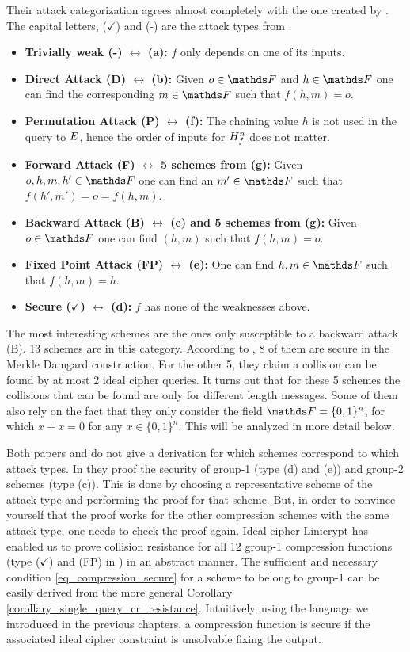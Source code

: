 Their attack categorization agrees almost completely with the one created by \cite{C:PreGovVan93}.
The capital letters, ($\checkmark$) and (-) are the attack types from \cite{C:PreGovVan93}.
\begin{itemize}
\item \textbf{Trivially weak (-) $\leftrightarrow$ (a):} $f$ only depends on one of its inputs.
\item \textbf{Direct Attack (D) $\leftrightarrow$ (b):} Given $o \in \F$ and $h \in \F$ one can find the corresponding $m \in \F$ such that $f(h,m) = o$.
\item \textbf{Permutation Attack (P) $\leftrightarrow$ (f):} The chaining value $h$ is not used in the query to $E$,
        hence the order of inputs for $H^n_f$ does not matter.
\item \textbf{Forward Attack (F) $\leftrightarrow$ 5 schemes from (g):} Given $o, h, m, h' \in \F$ one can find an $m' \in \F$ such that $f(h',m') = o = f(h, m)$.
\item \textbf{Backward Attack (B) $\leftrightarrow$ (c) and 5 schemes from (g):} Given $o \in \F$ one can find $(h,m)$ such that $f(h,m) = o$.
\item \textbf{Fixed Point Attack (FP) $\leftrightarrow$ (e):} One can find $h,m \in \F$ such that $f(h,m) = h$.
\item \textbf{Secure ($\checkmark$) $\leftrightarrow$ (d):} $f$ has none of the weaknesses above.
\end{itemize}
The most interesting schemes are the ones only susceptible to a backward attack (B).
13 schemes are in this category.
According to \cite{C:BlaRogShr02}, 8 of them are secure in the Merkle Damgard construction.
For the other 5, they claim a collision can be found by at most 2 ideal cipher queries.
It turns out that for these 5 schemes the collisions that can be found are only for different length messages.
Some of them also rely on the fact that they only consider the field $\F = \{0,1\}^n$, for which $x + x = 0$ for any $x \in \{0,1\}^n$.
This will be analyzed in more detail below.

Both papers \cite{C:PreGovVan93} and \cite{C:BlaRogShr02} do not give a derivation for which schemes correspond to which attack types.
In \cite{C:BlaRogShr02} they proof the security of group-1 (type (d) and (e)) and group-2 schemes (type (c)).
This is done by choosing a representative scheme of the attack type and performing the proof for that scheme.
But, in order to convince yourself that the proof works for the other compression schemes with the same attack type,
one needs to check the proof again.
Ideal cipher Linicrypt has enabled us to prove collision resistance for all 12 group-1 compression functions (type ($\checkmark$) and (FP) in \cite{C:PreGovVan93}) in an abstract manner.
The sufficient and necessary condition \eqref{eq_compression_secure} for a scheme to belong to group-1
can be easily derived from the more general Corollary \ref{corollary_single_query_cr_resistance}.
Intuitively, using the language we introduced in the previous chapters,
a compression function is secure if the associated ideal cipher constraint is unsolvable fixing the output.

